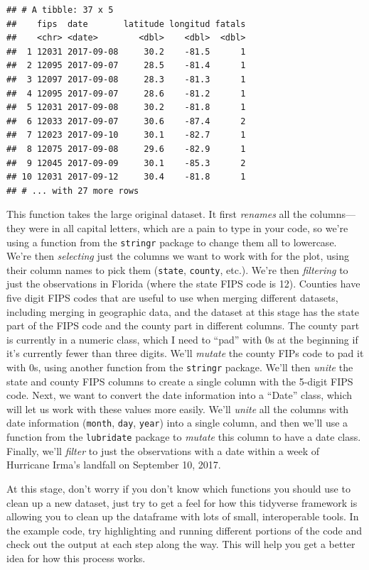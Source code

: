 \documentclass[]{tufte-book}
\begin{document}
\begin{verbatim}
## # A tibble: 37 x 5
##    fips  date       latitude longitud fatals
##    <chr> <date>        <dbl>    <dbl>  <dbl>
##  1 12031 2017-09-08     30.2    -81.5      1
##  2 12095 2017-09-07     28.5    -81.4      1
##  3 12097 2017-09-08     28.3    -81.3      1
##  4 12095 2017-09-07     28.6    -81.2      1
##  5 12031 2017-09-08     30.2    -81.8      1
##  6 12033 2017-09-07     30.6    -87.4      2
##  7 12023 2017-09-10     30.1    -82.7      1
##  8 12075 2017-09-08     29.6    -82.9      1
##  9 12045 2017-09-09     30.1    -85.3      2
## 10 12031 2017-09-12     30.4    -81.8      1
## # ... with 27 more rows
\end{verbatim}

This function takes the large
original dataset. It first \emph{renames} all the columns---they were in all capital letters,
which are a pain to type in your code, so we're using a function from the \texttt{stringr} package
to change them all to lowercase. We're then \emph{selecting} just the columns we want to work with
for the plot, using their column names to pick them (\texttt{state}, \texttt{county}, etc.). We're then
\emph{filtering} to just the observations in Florida (where the state FIPS code is 12).
Counties have five digit FIPS codes that are useful to use when merging different datasets,
including merging in geographic data, and the dataset at this stage has the state part of the
FIPS code and the county part in different columns. The county part is currently in a numeric
class, which I need to ``pad'' with 0s at the beginning if it's currently fewer than three digits.
We'll \emph{mutate} the county FIPs code to pad it with 0s, using another function from the
\texttt{stringr} package. We'll then \emph{unite} the state and county FIPS columns to create a single
column with the 5-digit FIPS code. Next, we want to convert the date information into
a ``Date'' class, which will let us work with these values more easily. We'll \emph{unite}
all the columns with date information (\texttt{month}, \texttt{day}, \texttt{year}) into a single column, and
then we'll use a function from the \texttt{lubridate} package to \emph{mutate} this column to have
a date class. Finally, we'll \emph{filter} to just the observations with a date within a week of
Hurricane Irma's landfall on September 10, 2017.

At this stage, don't worry if you don't know which functions you should use to clean up a
new dataset, just try to get a feel for how this tidyverse framework is allowing you to
clean up the dataframe with lots of small, interoperable tools. In the example code,
try highlighting and running different portions of the code and check out the output
at each step along the way. This will help you get a better idea for how this process works.
\end{document}
